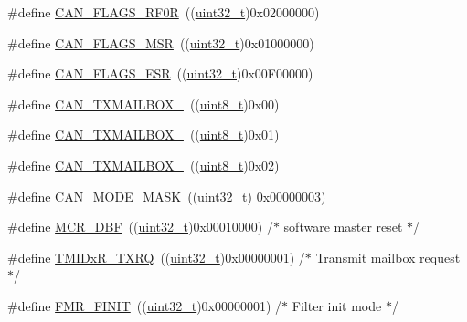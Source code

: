 \begin{DoxyCompactItemize}
\#define \hyperlink{group___c_a_n___private___defines_ga4b22b2552759778ac07825240823a45f}{C\+A\+N\+\_\+\+F\+L\+A\+G\+S\+\_\+\+R\+F0R}~((\hyperlink{_p_e___types_8h_a33594304e786b158f3fb30289278f5af}{uint32\+\_\+t})0x02000000)
\item 
\#define \hyperlink{group___c_a_n___private___defines_ga3aaa7df395ce1a90cb6e2ff3d2c4b24e}{C\+A\+N\+\_\+\+F\+L\+A\+G\+S\+\_\+\+M\+SR}~((\hyperlink{_p_e___types_8h_a33594304e786b158f3fb30289278f5af}{uint32\+\_\+t})0x01000000)
\item 
\#define \hyperlink{group___c_a_n___private___defines_ga14f7bb0b320da21443c9bd60b1f86b5d}{C\+A\+N\+\_\+\+F\+L\+A\+G\+S\+\_\+\+E\+SR}~((\hyperlink{_p_e___types_8h_a33594304e786b158f3fb30289278f5af}{uint32\+\_\+t})0x00\+F00000)
\item 
\#define \hyperlink{group___c_a_n___private___defines_gaa62f09d0693681cb7576f61c93b7cf0f}{C\+A\+N\+\_\+\+T\+X\+M\+A\+I\+L\+B\+O\+X\+\_}~((\hyperlink{_p_e___types_8h_aba7bc1797add20fe3efdf37ced1182c5}{uint8\+\_\+t})0x00)
\item 
\#define \hyperlink{group___c_a_n___private___defines_ga4e20f0aac1ac940014a6c66971890943}{C\+A\+N\+\_\+\+T\+X\+M\+A\+I\+L\+B\+O\+X\+\_}~((\hyperlink{_p_e___types_8h_aba7bc1797add20fe3efdf37ced1182c5}{uint8\+\_\+t})0x01)
\item 
\#define \hyperlink{group___c_a_n___private___defines_ga8a842aa352d72321930cc963b26bf6d7}{C\+A\+N\+\_\+\+T\+X\+M\+A\+I\+L\+B\+O\+X\+\_}~((\hyperlink{_p_e___types_8h_aba7bc1797add20fe3efdf37ced1182c5}{uint8\+\_\+t})0x02)
\item 
\#define \hyperlink{group___c_a_n___private___defines_ga79094ce5a3a2f717140e8cc9b7c161b6}{C\+A\+N\+\_\+\+M\+O\+D\+E\+\_\+\+M\+A\+SK}~((\hyperlink{_p_e___types_8h_a33594304e786b158f3fb30289278f5af}{uint32\+\_\+t}) 0x00000003)
\item 
\#define \hyperlink{group___c_a_n___private___defines_ga1ded3736beb63c49281f2983fc68c36d}{M\+C\+R\+\_\+\+D\+BF}~((\hyperlink{_p_e___types_8h_a33594304e786b158f3fb30289278f5af}{uint32\+\_\+t})0x00010000) /$\ast$ software master reset $\ast$/
\item 
\#define \hyperlink{group___c_a_n___private___defines_gabeb6db5ba5c01da5084ec1605f868e18}{T\+M\+I\+Dx\+R\+\_\+\+T\+X\+RQ}~((\hyperlink{_p_e___types_8h_a33594304e786b158f3fb30289278f5af}{uint32\+\_\+t})0x00000001) /$\ast$ Transmit mailbox request $\ast$/
\item 
\#define \hyperlink{group___c_a_n___private___defines_ga6125d0273c466e402db1a8f5bf888857}{F\+M\+R\+\_\+\+F\+I\+N\+IT}~((\hyperlink{_p_e___types_8h_a33594304e786b158f3fb30289278f5af}{uint32\+\_\+t})0x00000001) /$\ast$ Filter init mode $\ast$/

\end{DoxyCompactItemize}
